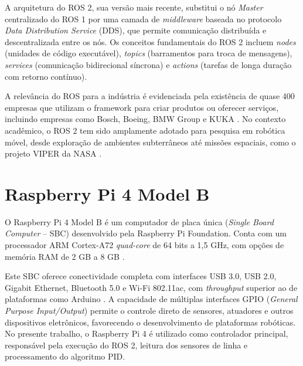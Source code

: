 A arquitetura do ROS 2, sua versão mais recente, substitui o nó \textit{Master} centralizado do ROS 1 por uma camada de \textit{middleware} baseada no protocolo \textit{Data Distribution Service} (DDS), que permite comunicação distribuída e descentralizada entre os nós. Os conceitos fundamentais do ROS 2 incluem \textit{nodes} (unidades de código executável), \textit{topics} (barramentos para troca de mensagens), \textit{services} (comunicação bidirecional síncrona) e \textit{actions} (tarefas de longa duração com retorno contínuo).

A relevância do ROS para a indústria é evidenciada pela existência de quase 400 empresas que utilizam o framework para criar produtos ou oferecer serviços, incluindo empresas como Bosch, Boeing, BMW Group e KUKA \cite{roscomp}. No contexto acadêmico, o ROS 2 tem sido amplamente adotado para pesquisa em robótica móvel, desde exploração de ambientes subterrâneos \cite{miller2020mine} até missões espaciais, como o projeto VIPER da NASA \cite{macenski2022robot}.


\section{Raspberry Pi 4 Model B}

O Raspberry Pi 4 Model B é um computador de placa única (\textit{Single Board Computer} -- SBC) desenvolvido pela Raspberry Pi Foundation. Conta com um processador ARM Cortex-A72 \textit{quad-core} de 64 bits a 1,5 GHz, com opções de memória RAM de 2 GB a 8 GB \cite{rpi4}.

Este SBC oferece conectividade completa com interfaces USB 3.0, USB 2.0, Gigabit Ethernet, Bluetooth 5.0 e Wi-Fi 802.11ac, com \textit{throughput} superior ao de plataformas como Arduino \cite{rpi_network_throughput}. A capacidade de múltiplas interfaces GPIO (\textit{General Purpose Input/Output}) permite o controle direto de sensores, atuadores e outros dispositivos eletrônicos, favorecendo o desenvolvimento de plataformas robóticas. No presente trabalho, o Raspberry Pi 4 é utilizado como controlador principal, responsável pela execução do ROS 2, leitura dos sensores de linha e processamento do algoritmo PID.
